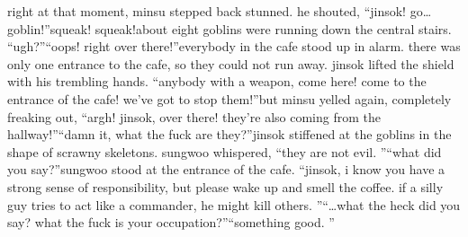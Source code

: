 right at that moment, minsu stepped back stunned.
 he shouted, “jinsok! go…goblin!”squeak! squeak!about eight goblins were running down the central stairs.
“ugh?”“oops! right over there!”everybody in the cafe stood up in alarm.
 there was only one entrance to the cafe, so they could not run away.
 jinsok lifted the shield with his trembling hands.
“anybody with a weapon, come here! come to the entrance of the cafe! we’ve got to stop them!”but minsu yelled again, completely freaking out, “argh! jinsok, over there! they’re also coming from the hallway!”“damn it, what the fuck are they?”jinsok stiffened at the goblins in the shape of scrawny skeletons.
sungwoo whispered, “they are not evil.
”“what did you say?”sungwoo stood at the entrance of the cafe.
“jinsok, i know you have a strong sense of responsibility, but please wake up and smell the coffee.
 if a silly guy tries to act like a commander, he might kill others.
”“…what the heck did you say? what the fuck is your occupation?”“something good.
”

 